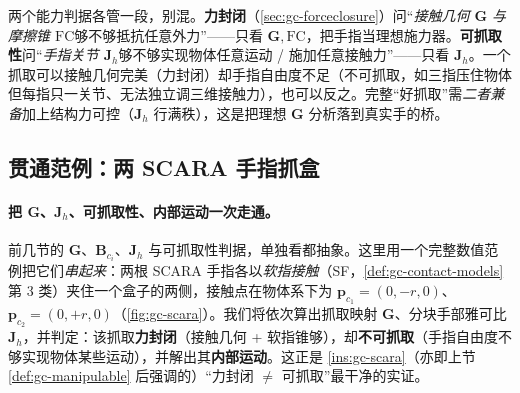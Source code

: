 \begin{insight}
两个能力判据各管一段，别混。\textbf{力封闭}（\cref{sec:gc-forceclosure}）问“\emph{接触几何 $\mathbf{G}$ 与摩擦锥 $\mathrm{FC}$}够不够抵抗任意外力”——只看 $\mathbf{G},\mathrm{FC}$，把手指当理想施力器。\textbf{可抓取性}问“\emph{手指关节 $\mathbf{J}_h$}够不够实现物体任意运动 / 施加任意接触力”——只看 $\mathbf{J}_h$。一个抓取可以接触几何完美（力封闭）却手指自由度不足（不可抓取，如三指压住物体但每指只一关节、无法独立调三维接触力），也可以反之。完整“好抓取”需\emph{二者兼备}加上结构力可控（$\mathbf{J}_h$ 行满秩），这是把理想 $\mathbf{G}$ 分析落到真实手的桥。
\end{insight}

\subsection{贯通范例：两 SCARA 手指抓盒}
\label{sec:gc-scara}

\paragraph{把 $\mathbf{G}$、$\mathbf{J}_h$、可抓取性、内部运动一次走通。}
前几节的 $\mathbf{G}$、$\mathbf{B}_{c_i}$、$\mathbf{J}_h$ 与可抓取性判据，单独看都抽象。这里用一个完整数值范例把它们\emph{串起来}\cite{murray1994mathematical}：两根 SCARA 手指各以\emph{软指接触}（SF，\cref{def:gc-contact-models} 第 3 类）夹住一个盒子的两侧，接触点在物体系下为 $\mathbf{p}_{c_1}=(0,-r,0)$、$\mathbf{p}_{c_2}=(0,+r,0)$（\cref{fig:gc-scara}）。我们将依次算出抓取映射 $\mathbf{G}$、分块手部雅可比 $\mathbf{J}_h$，并判定：该抓取\textbf{力封闭}（接触几何 + 软指锥够），却\textbf{不可抓取}（手指自由度不够实现物体某些运动），并解出其\textbf{内部运动}。这正是 \cref{ins:gc-scara}（亦即上节 \cref{def:gc-manipulable} 后强调的）“力封闭 $\ne$ 可抓取”最干净的实证。

